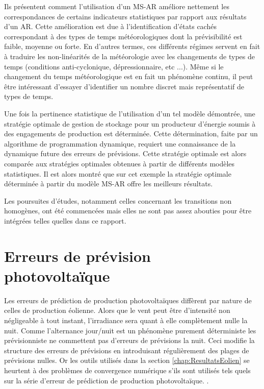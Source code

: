 \documentclass[12pt]{report}
\begin{document}
Ils présentent comment l'utilisation d'un MS-AR améliore nettement les correspondances de certains indicateurs statistiques par rapport aux résultats d'un AR. Cette amélioration est due à l'identification d'états cachés correspondant à des types de temps météorologiques dont la prévisibilité est faible, moyenne ou forte. En d'autres termes, ces différents régimes servent en fait à traduire les non-linéarités de la météorologie avec les changements de types de temps (conditions anti-cyclonique, dépressionnaire, etc ...). Même si le changement du temps météorologique est en fait un phénomène continu, il peut être intéressant d'essayer d'identifier un nombre discret mais représentatif de types de temps.

Une fois la pertinence statistique de l'utilisation d'un tel modèle démontrée, une stratégie optimale de gestion de stockage pour un producteur d'énergie soumis à des engagements de production est déterminée. Cette détermination, faite par un algorithme de programmation dynamique, requiert une connaissance de la dynamique future des erreurs de prévisions. Cette stratégie optimale est alors comparée aux stratégies optimales obtenues à partir de différents modèles statistiques. Il est alors montré que sur cet exemple la stratégie optimale déterminée à partir du modèle MS-AR offre les meilleurs résultats.

Les poursuites d'études, notamment celles concernant les transitions non homogènes, ont été commencées mais elles ne sont pas assez abouties pour être intégrées telles quelles dans ce rapport.

\chapter{Erreurs de prévision photovoltaïque}
\label{chap:PV}

Les erreurs de prédiction de production photovoltaïques diffèrent par nature de celles de production éolienne. Alors que le vent peut être d'intensité non négligeable à tout instant, l'irradiance sera quant à elle complètement nulle la nuit. Comme l'alternance jour/nuit est un phénomène purement déterministe les prévisionniste ne commettent pas d'erreurs de prévisions la nuit. Ceci modifie la structure des erreurs de prévisions en introduisant régulièrement des plages de prévisions nulles. Or les outils utilisés dans la section \ref{chap:ResultatsEolien} se heurtent à des problèmes de convergence numérique s'ils sont utilisés tels quels sur la série d'erreur de prédiction de production photovoltaïque. .
\end{document}
